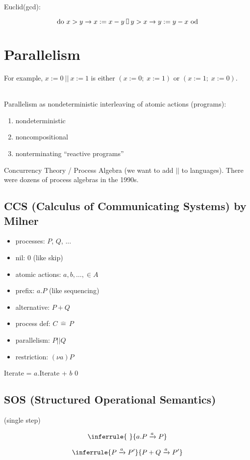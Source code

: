 {{Euclid(gcd):

$$ \textup{do } x > y \rightarrow x := x - y \vor y > x \rightarrow y := y - x \textup{ od} $$

\section{Parallelism}

For example, $ x := 0 ~||~ x := 1 $ is either $(x := 0;\; x := 1)$ or $(x := 1;\; x := 0)$.

~\\Parallelism as nondeterministic interleaving of atomic actions (programs):
\begin{enumerate}
	\item nondeterministic
	\item noncompositional
	\item nonterminating ``reactive programs''
\end{enumerate}
Concurrency Theory / Process Algebra (we want to add $||$ to languages).
There were dozens of process algebras in the 1990s.

\subsection{CCS (Calculus of Communicating Systems) by Milner}

\begin{itemize}
\item processes: $P$, $Q$, ...
\item nil: $0$ (like skip)
\item atomic actions: $a, b, \dots, \in A$
\item prefix: $a.P$ (like sequencing)
\item alternative: $P + Q$
\item process def: $C \,\hat{=}\, P$
\item parallelism: $P || Q$
\item restriction: $(\nu a) P$
\end{itemize}
Iterate = $a$.Iterate + $b$ 0

\subsection{SOS (Structured Operational Semantics)}
(single step)

$$\inferrule
{ ~ }
{ a.P \xrightarrow{a} P }
$$

$$\inferrule
{ P \xrightarrow{a} P' }
{ P+Q \xrightarrow{a} P' }
$$

}}
